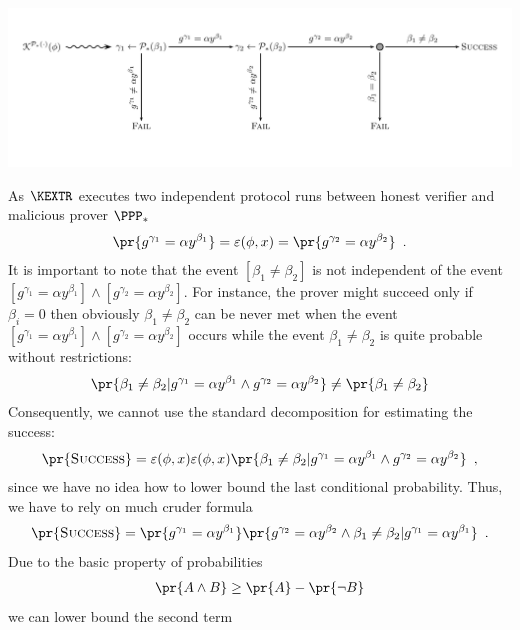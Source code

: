 \documentclass{crypto-exercise}
\begin{document}
\begin{solution}
\begin{center} 
\includegraphics[scale=0.90, trim = 0cm 1cm 0cm 0.5cm, clip]{./figures/0908-event-tree}
\end{center}
As $\KEXTR$ executes two independent protocol runs between honest verifier and malicious prover $\PPP_*$
\begin{align*}
\pr{g^{\gamma_1}=\alpha y^{\beta_1}}=\varepsilon(\phi,x)=\pr{g^{\gamma_2}=\alpha y^{\beta_2}}\enspace.
\end{align*}
It is important to note that the event $[\beta_1\neq \beta_2]$ is not independent of the  event 
$[g^{\gamma_1}=\alpha y^{\beta_1}]\wedge [g^{\gamma_2}=\alpha y^{\beta_2}]$. For instance, the prover might succeed only if $\beta_i=0$ then obviously $\beta_1\neq\beta_2$ can be never met when the event  
$[g^{\gamma_1}=\alpha y^{\beta_1}]\wedge [g^{\gamma_2}=\alpha y^{\beta_2}]$ occurs while the event $\beta_1\neq\beta_2$ is quite probable without restrictions:
\begin{align*}
\pr{\beta_1\neq\beta_2|g^{\gamma_1}=\alpha y^{\beta_1}\wedge g^{\gamma_2}=\alpha y^{\beta_2}}\neq \pr{\beta_1\neq\beta_2}
\end{align*}
Consequently, we cannot use the standard decomposition for estimating the success:
\begin{align*}
    \pr{\textsc{Success}} = \varepsilon(\phi,x) \varepsilon(\phi,x)\pr{\beta_1\neq\beta_2|g^{\gamma_1}=\alpha y^{\beta_1}\wedge g^{\gamma_2}=\alpha y^{\beta_2}}\enspace,
\end{align*}
since we have no idea how to lower bound the last conditional probability. Thus, we have to rely on much cruder formula
\begin{align*}
    \pr{\textsc{Success}} =\pr{g^{\gamma_1}=\alpha y^{\beta_1}}  \pr{g^{\gamma_2}=\alpha y^{\beta_2}\wedge\beta_1\neq\beta_2|g^{\gamma_1}=\alpha y^{\beta_1}}\enspace.
\end{align*}
Due to the basic property of probabilities
\begin{align*}
\pr{A\wedge B}\geq\pr{A}-\pr{\neg B}
\end{align*}
we can lower bound the second term

\end{solution}
\end{document}
